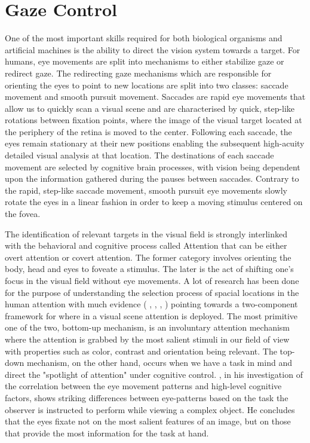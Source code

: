 \documentclass{l4proj}
\begin{document}
\section{Gaze Control}

One of the most important skills required for both biological organisms and artificial machines is the ability to direct the vision system towards a target. For humans, eye movements are split into mechanisms to either stabilize gaze or redirect gaze. The redirecting gaze mechanisms which are responsible for orienting the eyes to point to new locations are split into two classes: saccade movement and smooth pursuit movement. Saccades are rapid eye movements that allow us to quickly scan a visual scene and are characterised by quick, step-like rotations between fixation points, where the image of the visual target located at the periphery of the retina is moved to the center. Following each saccade, the eyes remain stationary at their new positions enabling the subsequent high-acuity detailed visual analysis at that location. The destinations of each saccade movement are selected by cognitive brain processes, with vision being dependent upon the information gathered during the pauses between saccades. Contrary to the rapid, step-like saccade movement, smooth pursuit eye movements slowly rotate the eyes in a linear fashion in order to keep a moving stimulus centered on the fovea.

The identification of relevant targets in the visual field is strongly interlinked with the behavioral and cognitive process called Attention that can be either overt attention or covert attention. The former category involves orienting the body, head and eyes to foveate a stimulus. The later is the act of shifting one's focus in the visual field without eye movements. A lot of research has been done for the purpose of understanding the selection process of spacial locations in the human attention with much evidence ( \citet{James1890}, \citet{Treissman1988}, \citet{Braun1998}, \citet{Itti2000} ) pointing towards a two-component framework for where in a visual scene attention is deployed. The most primitive one of the two, bottom-up mechanism, is an involuntary attention mechanism where the attention is grabbed by the most salient stimuli in our field of view with properties such as color, contrast and orientation being relevant. The top-down mechanism, on the other hand, occurs when we have a task in mind and direct the "spotlight of attention" under cognitive control. \citet{yarbus1967eye}, in his investigation of the correlation between the eye movement patterns and high-level cognitive factors, shows striking differences between eye-patterns based on the task the observer is instructed to perform while viewing a complex object. He concludes that the eyes fixate not on the most salient features of an image, but on those that provide the most information for the task at hand. 
\end{document}
